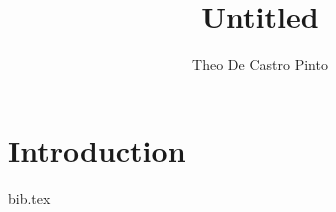 \documentclass{article}
\title{Untitled}
\author{Theo De Castro Pinto}
\date{}
\begin{document}
\maketitle

\newpage
\tableofcontents
\newpage

\section{Introduction}

\newpage

{bib.tex}
\end{document}
